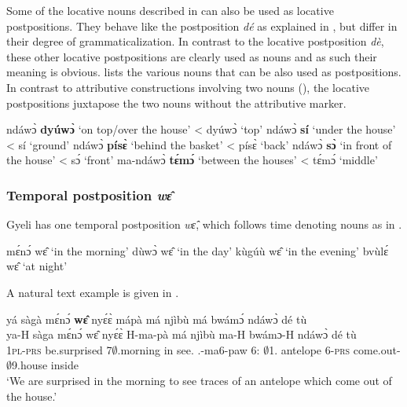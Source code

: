 Some of the locative nouns described in  can also be used as locative postpositions. They behave like the postposition {\itshape dé} as explained in  , but differ in their degree of grammaticalization.  In contrast to the locative postposition {\itshape dè}, these other locative postpositions are clearly used as nouns and as such their meaning is obvious.  lists the various nouns that can be also used as postpositions. In contrast to attributive constructions involving two nouns (), the locative postpositions juxtapose the two nouns without the attributive marker. 

\ea \label{Post}
  \ea  ndáwɔ̀ {\bfseries dyúwɔ̀} `on top/over the house' <  dyúwɔ̀ `top'
\ex ndáwɔ̀ {\bfseries sí} `under the house' <  sí `ground'
\ex ndáwɔ̀ {\bfseries písɛ̀} `behind the basket' <  písɛ̀ `back'
\ex ndáwɔ̀ {\bfseries sɔ̀} `in front of the house' <  sɔ́ `front' 
\ex ma-ndáwɔ̀ {\bfseries tɛ́mɔ́} `between the houses' < tɛ́mɔ́ `middle'
\z
\z





\subsubsection{Temporal postposition {\itshape wɛ̂ }}
\label{sec:POSTwe}

Gyeli has one temporal postposition {\itshape wɛ̂}, which follows time denoting nouns as in .

\ea \label{postwe}
  \ea  mɛ́nɔ́ wɛ̂  `in the morning'
\ex dùwɔ̀ wɛ̂  `in the day'
\ex kùgúù wɛ̂  `in the evening'
\ex bvùlɛ́ wɛ̂  `at night'
\z
\z


\noindent A natural text example is given in .

\ea \label{temppost}
  \glll   yá sàgà mɛ́nɔ́ {\bfseries wɛ̂} nyɛ́ɛ̀ mápà má njìbù má bwámɔ́ ndáwɔ̀ dé tù \\
          ya-H sàga mɛ́nɔ́ wɛ̂ nyɛ́ɛ̀ H-ma-pà má njìbù ma-H bwámɔ-H ndáwɔ̀ dé tù     \\
        1\textsc{pl}-\textsc{prs} be.surprised 7$\emptyset$.morning in see.{\SBJV} {\OBJ}.{\LINK}-ma6-paw 6:{\ATT} $\emptyset$1. antelope 6-\textsc{prs} come.out-{\R} $\emptyset$9.house {\LOC} inside  \\
    \trans `We are surprised in the morning to see traces of an antelope which come out of the house.'
\z





